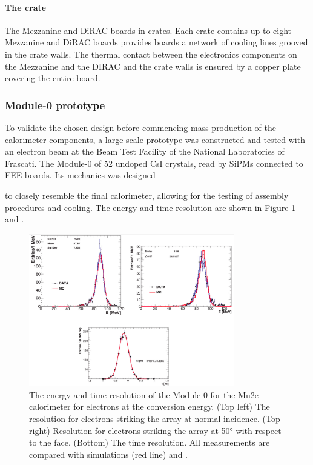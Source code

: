 \paragraph{The crate}
The Mezzanine and DiRAC boards  in crates.
Each crate contains up to eight Mezzanine 
and DiRAC boards provides  boards  a network of cooling lines grooved in the crate walls.
The thermal contact between the electronics components on the Mezzanine and the DIRAC
and the crate walls is ensured by a copper plate covering the entire board.
\subsubsection{Module-0 prototype}
To validate the chosen design before commencing  mass production of 
the calorimeter components, a large-scale prototype was constructed and 
tested with an electron beam at the Beam Test Facility of the National 
Laboratories of Frascati. The Module-0  of 52 undoped CsI crystals, 
read by { SiPMs} connected to FEE boards. Its mechanics was designed

to closely resemble the final calorimeter, allowing for the testing 
of  assembly procedures and cooling.
The energy and time resolution are
shown in Figure \ref{fig:calores} \cite{bobbb} and \cite{calo95}.
\begin{figure}[!h]
    \centering
    \includegraphics[width =0.8\textwidth]{figures/png/Screenshot_20240330_105520.png}
    \caption[The energy and time resolution of the calorimeter Module-0.]{The 
    energy and time resolution of the Module-0 for the Mu2e 
    calorimeter for electrons at the conversion energy. (Top left) The resolution 
    for electrons striking the array at normal incidence. (Top right) 
    Resolution for electrons striking the array at 50° with respect to the 
    face. (Bottom) The time resolution. All measurements are compared with 
    simulations (red line) \cite{bobbb} and \cite{calo95}.}
    \label{fig:calores}
\end{figure}
